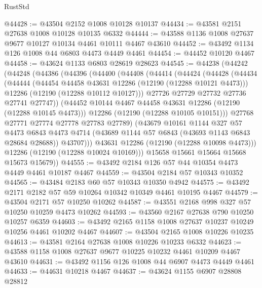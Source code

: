 \begin{lexlean}{RustStd}
\begin{coremodule}
@44428 := @43504 @2152 @1008 @10128 @10137
@44434 := @43581 @2151 @27638 @1008 @10128 @10135 @6332
@44444 := @43588 @1136 @1008 @27637 @9677 @10127 @10134 @4461 @10111 @4467 @43610
@44452 := @43492 @1134 @126 @1008 @44 @6803 @4473 @4449 @4461
@44454 := @44452 @10120 @4467
@44458 := @43624 @1133 @6803 @28619 @28623
@44545 := @44238
    (@44242
      (@44248
        (@44386
          (@44396
            (@44400
              (@44408
                (@44414
                  (@44424
                    (@44428
                      (@44434
                        (@44444
                          (@44454 @44458 @43631 @12286 (@12190 (@12288 @10121 @4473)))
                          @12286
                          (@12190 (@12288 @10112 @10127)))
                        @27726
                        @27729
                        @27732
                        @27736
                        @27741
                        @27747))
                    (@44452 @10144 @4467 @44458 @43631 @12286 (@12190 (@12288 @10145 @4473)))
                    @12286
                    (@12190 (@12288 @10105 @10151)))
                  @27768
                  @27771
                  @27774
                  @27778
                  @27783
                  @27789)
                (@43679
                  @10161
                  @1144
                  @327
                  @57
                  @4473
                  @6843
                  @4473
                  @4714
                  (@43689 @1144 @57 @6843 (@43693 @1143 @6843 @28684 @28688))
                  @43707)))
            @43631
            @12286
            (@12190 (@12288 @10098 @4473)))
          @12286
          (@12190 (@12288 @10024 @10169)))
        @15658
        @15661
        @15664
        @15668
        @15673
        @15679))
@44555 := @43492 @2184 @126 @57 @44 @10354 @4473 @4449 @4461 @10187 @4467
@44559 := @43504 @2184 @57 @10343 @10352
@44565 := @43484 @2183 @60 @57 @10343 @10350 @4942
@44575 := @43492 @2171 @2182 @57 @59 @10264 @10342 @10349 @4461 @10195 @4467
@44579 := @43504 @2171 @57 @10250 @10262
@44587 := @43551 @2168 @998 @327 @57 @10250 @10259 @4473 @10262
@44593 := @43560 @2167 @27638 @790 @10250 @10257 @6359
@44603 := @43492 @2165 @1158 @1008 @27637 @10237 @10249 @10256 @4461 @10202 @4467
@44607 := @43504 @2165 @1008 @10226 @10235
@44613 := @43581 @2164 @27638 @1008 @10226 @10233 @6332
@44623 := @43588 @1158 @1008 @27637 @9677 @10225 @10232 @4461 @10209 @4467 @43610
@44631 := @43492 @1156 @126 @1008 @44 @6907 @4473 @4449 @4461
@44633 := @44631 @10218 @4467
@44637 := @43624 @1155 @6907 @28808 @28812

\end{coremodule}
\end{lexlean}
